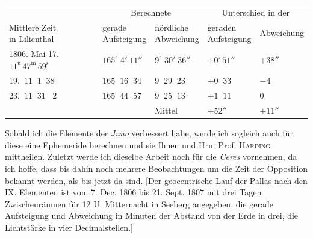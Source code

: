 \begin{center}\begingroup
\fontsize{9}{11}\selectfont
\setlength{\tabcolsep}{2pt}\renewcommand{\arraystretch}{1.12}
\begin{tabular}{l|l|l|l|l}
& \multicolumn{2}{c|}{Berechnete} & \multicolumn{2}{c}{Unterschied in der} \\
\shortstack{Mittlere Zeit\\in Lilienthal} & \shortstack{gerade\\Aufsteigung} & \shortstack{nördliche\\Abweichung} & \shortstack{geraden\\Aufsteigung} & Abweichung \\
\hline
1806. Mai 17.\ $11^{\mathrm{u}}\,47^{\mathrm{m}}\,59^{\mathrm{s}}$ & $165^\circ\;4'\;11''$ & $9^\circ\;30'\;36''$ & $+0'\,51''$ & $+38''$ \\
19.\ $11\;\;1\;\;38$ & $165\;\;16\;\;34$ & $9\;\;29\;\;23$ & $+0\;\;33$ & $-4$ \\
23.\ $11\;\;31\;\;\;2$ & $165\;\;44\;\;57$ & $9\;\;25\;\;13$ & $+1\;\;11$ & $0$ \\
\cline{3-5}
& & Mittel & $+52''$ & $+11''$ \\
\end{tabular}\endgroup\end{center}

\par\indent Sobald ich die Elemente der \emph{Juno} verbessert habe, werde ich sogleich auch für diese eine Ephemeride berechnen und sie Ihnen und Hrn. Prof. \textsc{Harding} mittheilen. Zuletzt werde ich dieselbe Arbeit
noch für die \emph{Ceres} vornehmen, da ich hoffe, dass bis dahin noch mehrere Beobachtungen um die Zeit
der Opposition bekannt werden, als bis jetzt da sind. [Der geocentrische Lauf der Pallas nach den IX.
Elementen ist vom 7. Dec. 1806 bis 21. Sept. 1807 mit drei Tagen Zwischenräumen für 12 U. Mitternacht
in Seeberg angegeben, die gerade Aufsteigung und Abweichung in Minuten der Abstand von der Erde
in drei, die Lichtstärke in vier Decimalstellen.]
